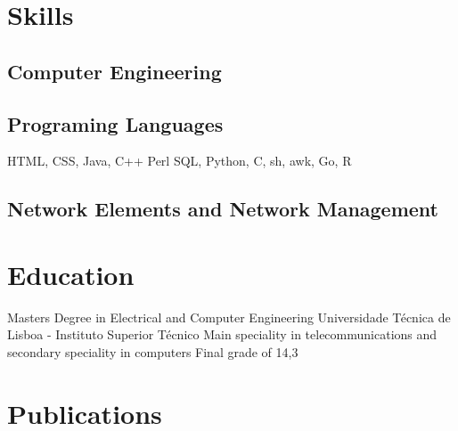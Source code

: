 \documentclass[12pt,a4paper, roman]{moderncv} %
\begin{document}
\section{Skills}
\subsection{Computer Engineering}


\subsection{Programing Languages}
	{ HTML, CSS, Java, C++}
	{Perl}
	{SQL, Python, C, sh, awk, Go, R}

\subsection{Network Elements and Network Management}




\section{Education}

	{Masters Degree in Electrical and Computer Engineering}
	{Universidade Técnica de Lisboa - Instituto Superior Técnico}
	{Main speciality in telecommunications and secondary speciality in computers }
	{Final grade of 14,3}{} 

\section{Publications}
\end{document}
